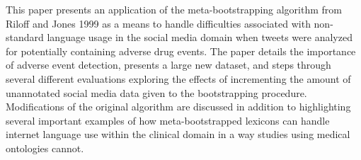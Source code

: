 This paper presents an application of the meta-bootstrapping algorithm from Riloff and Jones 1999 as a means to handle difficulties associated with non-standard language usage in the social media domain when tweets were analyzed for potentially containing adverse drug events. The paper details the importance of adverse event detection, presents a large new dataset, and steps through several different evaluations exploring the effects of incrementing the amount of unannotated social media data given to the bootstrapping procedure. Modifications of the original algorithm are discussed in addition to highlighting several important examples of how meta-bootstrapped lexicons can handle internet language use within the clinical domain in a way studies using medical ontologies cannot.
